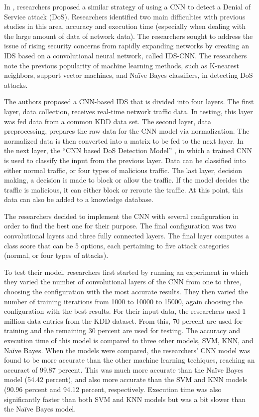 In \cite{nguyen18}, researchers proposed a similar strategy of using a CNN to detect a Denial of Service attack (DoS). Researchers identified two main difficulties with previous studies in this area, accuracy and execution time (especially when dealing with the large amount of data of network data). The researchers sought to address the issue of rising security concerns from rapidly expanding networks by creating an IDS based on a convolutional neural network, called IDS-CNN. The researchers note the previous popularity of machine learning methods, such as K-nearest neighbors, support vector machines, and Naïve Bayes classifiers, in detecting DoS attacks. 

The authors proposed a CNN-based IDS that is divided into four layers. The first layer, data collection, receives real-time network traffic data. In testing, this layer was fed data from a common KDD data set. The second layer, data preprocessing, prepares the raw data for the CNN model via normalization. The normalized data is then converted into a matrix to be fed to the next layer. In the next layer, the “CNN based DoS Detection Model” \cite{su19}, in which a trained CNN is used to classify the input from the previous layer. Data can be classified into either normal traffic, or four types of malicious traffic. The last layer, decision making, a decision is made to block or allow the traffic. If the model decides the traffic is malicious, it can either block or reroute the traffic. At this point, this data can also be added to a knowledge database. 

The researchers decided to implement the CNN with several configuration in order to find the best one for their purpose. The final configuration was two convolutional layers and three fully connected layers. The final layer computes a class score that can be 5 options, each pertaining to five attack categories (normal, or four types of attacks). 

To test their model, researchers first started by running an experiment in which they varied the number of convolutional layers of the CNN from one to three, choosing the configuration with the most accurate results. They then varied the number of training iterations from 1000 to 10000 to 15000, again choosing the configuration with the best results. For their input data, the researchers used 1 million data entries from the KDD dataset. From this, 70 percent are used for training and the remaining 30 percent are used for testing. The accuracy and execution time of this model is compared to three other models, SVM, KNN, and Naïve Bayes. 
When the models were compared, the researchers’ CNN model was found to be more accurate than the other machine learning techiques, reaching an accuract of 99.87 percent. This was much more accurate than the Naïve Bayes model (54.42 percent), and also more accurate than the SVM and KNN models (90.96 percent and 94.12 percent, respectively. Execution time was also significantly faster than both SVM and KNN models but was a bit slower than the Naïve Bayes model. 


